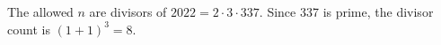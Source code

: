 The allowed $n$ are divisors of $2022=2\cdot3\cdot337$. Since 337 is prime, the divisor count is $(1+1)^3=\boxed8$.
